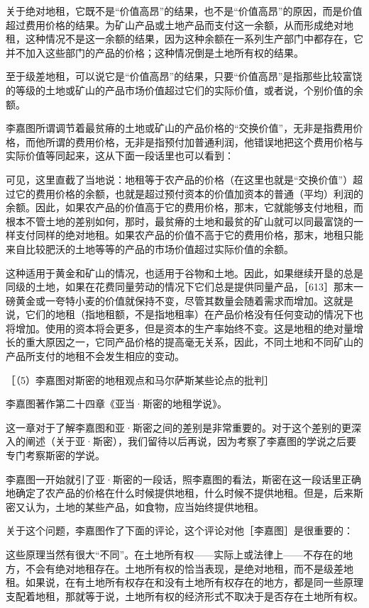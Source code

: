 关于绝对地租，它既不是“价值高昂”的结果，也不是“价值高昂”的原因，而是价值超过费用价格的结果。为矿山产品或土地产品而支付这一余额，从而形成绝对地租，这种情况不是这一余额的结果，因为这种余额在一系列生产部门中都存在，它并不加入这些部门的产品的价格；这种情况倒是土地所有权的结果。

至于级差地租，可以说它是“价值高昂”的结果，只要“价值高昂”是指那些比较富饶的等级的土地或矿山的产品市场价值超过它们的实际价值，或者说，个别价值的余额。

李嘉图所谓调节着最贫瘠的土地或矿山的产品价格的“交换价值”，无非是指费用价格，而他所谓的费用价格，无非是指预付加普通利润，他错误地把这个费用价格与实际价值等同起来，这从下面一段话里也可以看到：



可见，这里直截了当地说：地租等于农产品的价格（在这里也就是“交换价值”）超过它的费用价格的余额，也就是超过预付资本的价值加资本的普通（平均）利润的余额。因此，如果农产品的价值高于它的费用价格，那末，它就能够支付地租，而根本不管土地的差别如何，那时，最贫瘠的土地和最贫的矿山就可以同最富饶的一样支付同样的绝对地租。如果农产品的价值不高于它的费用价格，那末，地租只能来自比较肥沃的土地等等的产品的市场价值超过实际价值的余额。



这种适用于黄金和矿山的情况，也适用于谷物和土地。因此，如果继续开垦的总是同级的土地，如果在花费同量劳动的情况下它们总是提供同量产品，［613］那末一磅黄金或一夸特小麦的价值就保持不变，尽管其数量会随着需求而增加。这就是说，它们的地租（指地租额，不是指地租率）在产品价格没有任何变动的情况下也将增加。使用的资本将会更多，但是资本的生产率始终不变。这是地租的绝对量增长的重大原因之一，它同产品价格的提高毫无关系，因此，不同土地和不同矿山的产品所支付的地租不会发生相应的变动。

［（5）李嘉图对斯密的地租观点和马尔萨斯某些论点的批判］

李嘉图著作第二十四章《亚当·斯密的地租学说》。

这一章对于了解李嘉图和亚·斯密之间的差别是非常重要的。对于这个差别的更深入的阐述（关于亚·斯密），我们留待以后再说，因为考察了李嘉图的学说之后要专门考察斯密的学说。

李嘉图一开始就引了亚·斯密的一段话，照李嘉图的看法，斯密在这一段话里正确地确定了农产品的价格在什么时候提供地租，什么时候不提供地租。但是，后来斯密又认为，土地的某些产品，如食物，应当始终提供地租。

关于这个问题，李嘉图作了下面的评论，这个评论对他［李嘉图］是很重要的：



这些原理当然有很大“不同”。在土地所有权——实际上或法律上——不存在的地方，不会有绝对地租存在。土地所有权的恰当表现，是绝对地租，而不是级差地租。如果说，在有土地所有权存在和没有土地所有权存在的地方，都是同一些原理支配着地租，那就等于说，土地所有权的经济形式不取决于是否存在土地所有权。

